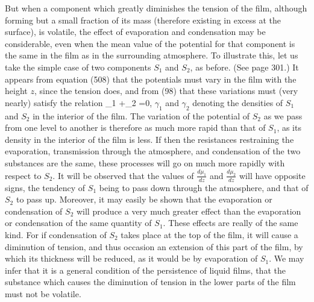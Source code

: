 \documentclass[12pt]{article}
\begin{document}
But when a component which greatly diminishes the tension of the film, although forming but a small fraction of its mass (therefore existing in excess at the surface), is volatile, the effect of evaporation and condensation may be considerable, even when the mean value of the potential for that component is the same in the film as in the surrounding atmosphere. To illustrate this, let us take the simple case of two components $S_1$ and $S_2$, as before. (See page 301.) It appears from equation (508) that the potentials must vary in the film with the height $z$, since the tension does, and from (98) that these variations must (very nearly) satisfy the relation
\eqs \gamma_1   +\gamma_2  =0,   \label{658} \eqe
$\gamma_1$ and $\gamma_2$ denoting the densities of $S_1$ and $S_2$ in the interior of the film. The variation of the potential of $S_2$ as we pass from one level to another is therefore as much more rapid than that of $S_1$, as its density in the interior of the film is less. If then the resistances restraining the evaporation, transmission through the atmosphere, and condensation of the two substances are the same, these processes will go on much more rapidly with respect to $S_2$. It will be observed that the values of $\frac{d\mu_1}{dz}$ and $\frac{d\mu_2}{dz}$ will have opposite signs, the tendency of $S_1$ being to pass down through the atmosphere, and that of $S_2$ to pass up. Moreover, it may easily be shown that the evaporation or condensation of $S_2$ will produce a very much greater effect than the evaporation or condensation of the same quantity of $S_1$. These effects are really of the same kind. For if condensation of $S_2$ takes place at the top of the film, it will cause a diminution of tension, and thus occasion an extension of this part of the film, by which its thickness will be reduced, as it would be by evaporation of $S_1$. We may infer that it is a general condition of the persistence of liquid films, that the substance which causes the diminution of tension in the lower parts of the film must not be volatile.
\end{document}
